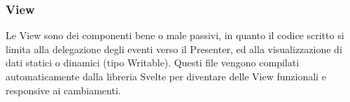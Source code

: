     \subsubsection{View}
        Le View sono dei componenti bene o male passivi, in quanto il codice scritto si limita alla delegazione degli eventi verso il Presenter, ed alla visualizzazione di dati statici o dinamici (tipo Writable). 
        Questi file vengono compilati automaticamente dalla libreria Svelte per diventare delle View funzionali e responsive ai cambiamenti.

